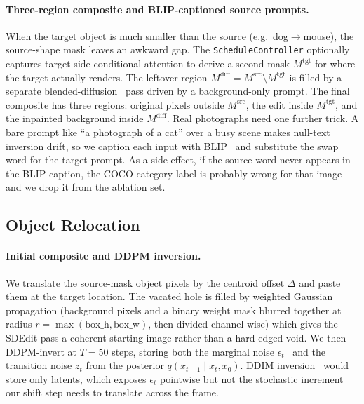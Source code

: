 \documentclass[10pt,twocolumn,letterpaper]{article}
\begin{document}
\paragraph{Three-region composite and BLIP-captioned source prompts.}
When the target object is much smaller than the source (e.g.\ dog$\to$mouse), the source-shape mask leaves an awkward gap. The \texttt{ScheduleController} optionally captures target-side conditional attention to derive a second mask $M^{\text{tgt}}$ for where the target actually renders. The leftover region $M^{\text{diff}} = M^{\text{src}} \setminus M^{\text{tgt}}$ is filled by a separate blended-diffusion~\cite{avrahami2022blended} pass driven by a background-only prompt. The final composite has three regions: original pixels outside $M^{\text{src}}$, the edit inside $M^{\text{tgt}}$, and the inpainted background inside $M^{\text{diff}}$. Real photographs need one further trick. A bare prompt like ``a photograph of a cat'' over a busy scene makes null-text inversion drift, so we caption each input with BLIP~\cite{li2022blip} and substitute the swap word for the target prompt. As a side effect, if the source word never appears in the BLIP caption, the COCO category label is probably wrong for that image and we drop it from the ablation set.

\subsection{Object Relocation}
\label{sec:relocate}

\paragraph{Initial composite and DDPM inversion.}
We translate the source-mask object pixels by the centroid offset $\Delta$ and paste them at the target location. The vacated hole is filled by weighted Gaussian propagation (background pixels and a binary weight mask blurred together at radius $r = \max(\text{box\_h}, \text{box\_w})$, then divided channel-wise) which gives the SDEdit pass a coherent starting image rather than a hard-edged void. We then DDPM-invert at $T = 50$ steps, storing both the marginal noise $\epsilon_t$~\cite{ho2020ddpm} and the transition noise $z_t$ from the posterior $q(x_{t-1} \mid x_t, x_0)$. DDIM inversion~\cite{song2021ddim} would store only latents, which exposes $\epsilon_t$ pointwise but not the stochastic increment our shift step needs to translate across the frame.
\end{document}
